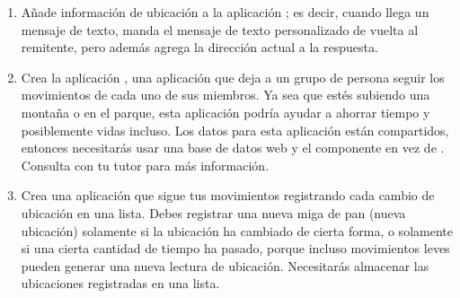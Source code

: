 \begin{enumerate}

\item Añade información de ubicación a la aplicación ; es decir, cuando llega un mensaje de texto, manda el
  mensaje de texto personalizado de vuelta al remitente, pero además
  agrega la dirección actual a la respuesta.

\item Crea la aplicación , una aplicación que deja
  a un grupo de persona seguir los movimientos de cada uno de sus
  miembros. Ya sea que estés subiendo una montaña o en el parque, esta
  aplicación podría ayudar a ahorrar tiempo y posiblemente vidas
  incluso. Los datos para esta aplicación están compartidos, entonces
necesitarás usar una base de datos web y el componente
 en vez de . Consulta con tu
tutor para más información.

\item Crea una aplicación  que sigue tus
  movimientos registrando cada cambio de ubicación en una lista. Debes
  registrar una nueva miga de pan (nueva ubicación) solamente si la
  ubicación ha cambiado de cierta forma, o solamente si una cierta
  cantidad de tiempo ha pasado, porque incluso movimientos leves
  pueden generar una nueva lectura de ubicación. Necesitarás almacenar
  las ubicaciones registradas en una lista.

\end{enumerate}